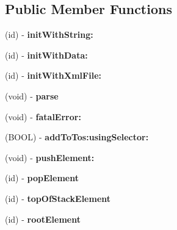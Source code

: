 \subsection*{Public Member Functions}
\begin{DoxyCompactItemize}
\item 
\hypertarget{interface_iota_x_m_l_parser_a0eaf23a9318321b0d9cc9a98a0518136}{
(id) -\/ {\bfseries initWithString:}}
\label{interface_iota_x_m_l_parser_a0eaf23a9318321b0d9cc9a98a0518136}

\item 
\hypertarget{interface_iota_x_m_l_parser_ab562f4617df6775c5c0ac832f07f002c}{
(id) -\/ {\bfseries initWithData:}}
\label{interface_iota_x_m_l_parser_ab562f4617df6775c5c0ac832f07f002c}

\item 
\hypertarget{interface_iota_x_m_l_parser_ab7b9eb1efefa3a43904b394a5f911623}{
(id) -\/ {\bfseries initWithXmlFile:}}
\label{interface_iota_x_m_l_parser_ab7b9eb1efefa3a43904b394a5f911623}

\item 
\hypertarget{interface_iota_x_m_l_parser_a073729517df07d0dec75f3587662f5ec}{
(void) -\/ {\bfseries parse}}
\label{interface_iota_x_m_l_parser_a073729517df07d0dec75f3587662f5ec}

\item 
\hypertarget{interface_iota_x_m_l_parser_a85dc03c87c87f0a4c41a0f75f6d268a5}{
(void) -\/ {\bfseries fatalError:}}
\label{interface_iota_x_m_l_parser_a85dc03c87c87f0a4c41a0f75f6d268a5}

\item 
\hypertarget{interface_iota_x_m_l_parser_a0b16e148f73667e6e68876a7d0672a43}{
(BOOL) -\/ {\bfseries addToTos:usingSelector:}}
\label{interface_iota_x_m_l_parser_a0b16e148f73667e6e68876a7d0672a43}

\item 
\hypertarget{interface_iota_x_m_l_parser_a6c5402de92d53b1d2428ef52531d0a3b}{
(void) -\/ {\bfseries pushElement:}}
\label{interface_iota_x_m_l_parser_a6c5402de92d53b1d2428ef52531d0a3b}

\item 
\hypertarget{interface_iota_x_m_l_parser_a245e833a93ccbf32ce043690853fd1eb}{
(id) -\/ {\bfseries popElement}}
\label{interface_iota_x_m_l_parser_a245e833a93ccbf32ce043690853fd1eb}

\item 
\hypertarget{interface_iota_x_m_l_parser_a4270947fe34de24febfb3aaae890a056}{
(id) -\/ {\bfseries topOfStackElement}}
\label{interface_iota_x_m_l_parser_a4270947fe34de24febfb3aaae890a056}

\item 
\hypertarget{interface_iota_x_m_l_parser_a533962609069072cece4e5974c5c033b}{
(id) -\/ {\bfseries rootElement}}
\label{interface_iota_x_m_l_parser_a533962609069072cece4e5974c5c033b}

\end{DoxyCompactItemize}
